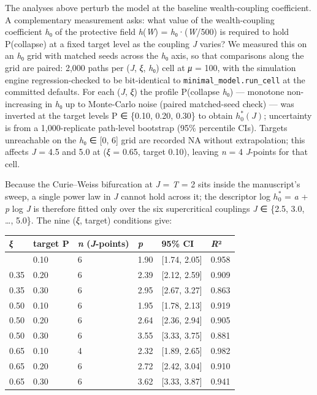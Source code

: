 \documentclass[11pt,letterpaper]{article}
\newcounter{none}
\begin{document}
The analyses above perturb the model at the baseline wealth-coupling coefficient. A complementary measurement asks: what value of the wealth-coupling coefficient \emph{h}₀ of the protective field \emph{h}(\emph{W}) = \emph{h}₀·(\emph{W}/500) is required to hold P(collapse) at a fixed target level as the coupling \emph{J} varies? We measured this on an \emph{h}₀ grid with matched seeds across the \emph{h}₀ axis, so that comparisons along the grid are paired: 2,000 paths per (\emph{J}, \emph{ξ}, \emph{h}₀) cell at \emph{μ} = 100, with the simulation engine regression-checked to be bit-identical to \texttt{minimal\_model.run\_cell} at the committed defaults. For each (\emph{J}, \emph{ξ}) the profile P(collapse \textbar{} \emph{h}₀) --- monotone non-increasing in \emph{h}₀ up to Monte-Carlo noise (paired matched-seed check) --- was inverted at the target levels P ∈ \{0.10, 0.20, 0.30\} to obtain \(h_0^*(J)\); uncertainty is from a 1,000-replicate path-level bootstrap (95\% percentile CIs). Targets unreachable on the \emph{h}₀ ∈ {[}0, 6{]} grid are recorded NA without extrapolation; this affects \emph{J} = 4.5 and 5.0 at (\emph{ξ} = 0.65, target 0.10), leaving \emph{n} = 4 \emph{J}-points for that cell.

Because the Curie--Weiss bifurcation at \emph{J} = \emph{T} = 2 sits inside the manuscript's sweep, a single power law in \emph{J} cannot hold across it; the descriptor log \(h_0^*\) = \emph{a} + \emph{p} log \emph{J} is therefore fitted only over the six supercritical couplings \emph{J} ∈ \{2.5, 3.0, \ldots, 5.0\}. The nine (\emph{ξ}, target) conditions give:

{\def\LTcaptype{none} %
\begin{longtable}[]{@{}llllll@{}}
\toprule\noalign{}
\emph{ξ} & target P & \emph{n} (\emph{J}-points) & \emph{p} & 95\% CI & \emph{R}² \\
\midrule\noalign{}
\endhead
\bottomrule\noalign{}
\endlastfoot
0.35 & 0.10 & 6 & 1.90 & {[}1.74, 2.05{]} & 0.958 \\
0.35 & 0.20 & 6 & 2.39 & {[}2.12, 2.59{]} & 0.909 \\
0.35 & 0.30 & 6 & 2.95 & {[}2.67, 3.27{]} & 0.863 \\
0.50 & 0.10 & 6 & 1.95 & {[}1.78, 2.13{]} & 0.919 \\
0.50 & 0.20 & 6 & 2.64 & {[}2.36, 2.94{]} & 0.905 \\
0.50 & 0.30 & 6 & 3.55 & {[}3.33, 3.75{]} & 0.881 \\
0.65 & 0.10 & 4 & 2.32 & {[}1.89, 2.65{]} & 0.982 \\
0.65 & 0.20 & 6 & 2.72 & {[}2.42, 3.04{]} & 0.910 \\
0.65 & 0.30 & 6 & 3.62 & {[}3.33, 3.87{]} & 0.941 \\
\end{longtable}
}
\end{document}
